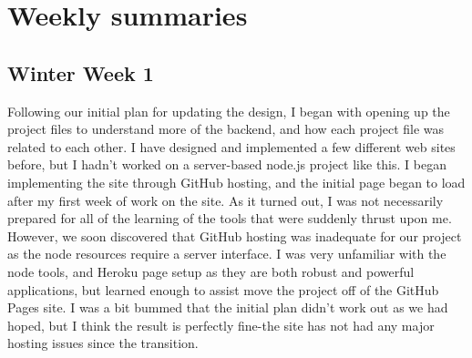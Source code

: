 \documentclass[letterpaper, 10pt, draftclsnofoot, compsoc, onecolumn]{IEEEtran}
\begin{document}

\section{Weekly summaries}

\subsection{Winter Week 1}
 Following our initial plan for updating the design, I began with opening up the project files to understand more of the backend, and how each project file was related to each other. I have designed and implemented a few different web sites before, but I hadn't worked on a server-based node.js project like this.  I began implementing the site through GitHub hosting, and the initial page began to load after my first week of work on the site. As it turned out, I was not necessarily prepared for all of the learning of the tools that were suddenly thrust upon me. However, we soon discovered that GitHub hosting was inadequate for our project as the node resources require a server interface. I was very unfamiliar with the node tools, and Heroku page setup as they are both robust and powerful applications, but learned enough to assist move the project off of the GitHub Pages site. I was a bit bummed that the initial plan didn't work out as we had hoped, but I think the result is perfectly fine-the site has not had any major hosting issues since the transition.
\end{document}
